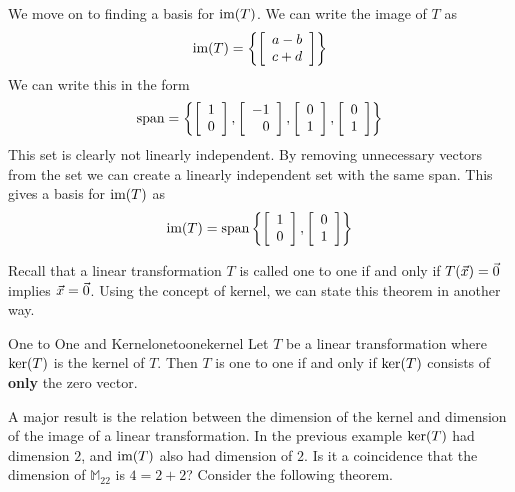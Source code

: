 \begin{solution}
We move on to finding a basis for $\mbox{im}(T)$. We can write the image of $T$ as 
\[
\mbox{im}(T) = \left\{ \left[ \begin{array}{c}
a - b \\
c + d
\end{array} \right]
\right\}
\]
We can write this in the form
\[
\mbox{span} = \left\{ 
\left[ \begin{array}{r}
1 \\
0
\end{array} \right], 
\left[ \begin{array}{r}
-1 \\
0
\end{array} \right], 
\left[ \begin{array}{r}
0 \\
1
\end{array} \right], 
\left[ \begin{array}{r}
0 \\
1
\end{array} \right] \right\}
\]
This set is clearly not linearly independent. By removing unnecessary vectors from the set we can create a linearly independent set with the same span. This gives a basis for $\mbox{im}(T)$ as
\[
\mbox{im}(T) = \mbox{span} \left\{
\left[ \begin{array}{r}
1 \\
0
\end{array} \right],
\left[ \begin{array}{r}
0 \\
1
\end{array} \right]
\right\}
\]
\end{solution}

Recall that a linear transformation $T$ is called one to one if and only if $T(\vec{x}) = \vec{0}$ implies $\vec{x} = \vec{0}$. Using the concept of kernel, we can state this theorem in another way.

\begin{theorem}{One to One and Kernel}{onetoonekernel}
Let $T$ be a linear transformation where $\mbox{ker}(T)$ is the kernel of $T$. Then $T$ is one to one if and only if $\mbox{ker}(T)$ consists of \textbf{only} the zero vector. 
\end{theorem}

A major result is the relation between the dimension of the kernel and
dimension of the image of a linear transformation. In the previous example $\mbox{ker}(T)$ had dimension $2$, and $\mbox{im}(T)$ also had dimension of $2$. Is it a coincidence that the dimension of $\mathbb{M}_{22}$ is $4 = 2 + 2$? Consider the following theorem. 


